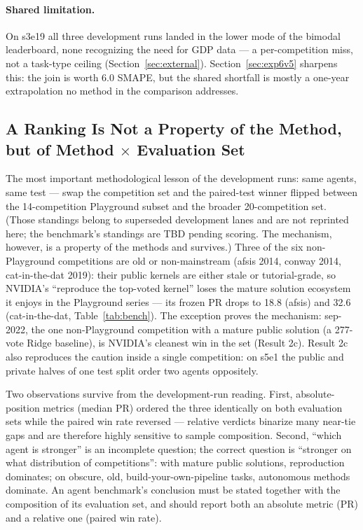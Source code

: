 \documentclass[11pt,a4paper]{article}
\begin{document}
\paragraph{Shared limitation.} On s3e19 all three development runs landed in the lower mode of the bimodal leaderboard, none recognizing the need for GDP data --- a per-competition miss, not a task-type ceiling (Section~\ref{sec:external}). Section~\ref{sec:exp6v5} sharpens this: the join is worth $6.0$ SMAPE, but the shared shortfall is mostly a one-year extrapolation no method in the comparison addresses.

\subsection{A Ranking Is Not a Property of the Method, but of Method $\times$ Evaluation Set}
\label{sec:reversal}

The most important methodological lesson of the development runs: same agents, same test --- swap the competition set and the paired-test winner flipped between the 14-competition Playground subset and the broader 20-competition set. (Those standings belong to superseded development lanes and are not reprinted here; the benchmark's standings are TBD pending scoring. The mechanism, however, is a property of the methods and survives.) Three of the six non-Playground competitions are old or non-mainstream (afsis 2014, conway 2014, cat-in-the-dat 2019): their public kernels are either stale or tutorial-grade, so NVIDIA's ``reproduce the top-voted kernel'' loses the mature solution ecosystem it enjoys in the Playground series --- its frozen PR drops to 18.8 (afsis) and 32.6 (cat-in-the-dat, Table~\ref{tab:bench}). The exception proves the mechanism: sep-2022, the one non-Playground competition with a mature public solution (a 277-vote Ridge baseline), is NVIDIA's cleanest win in the set (Result 2c). Result 2c also reproduces the caution inside a single competition: on s5e1 the public and private halves of one test split order two agents oppositely.

Two observations survive from the development-run reading. First, absolute-position metrics (median PR) ordered the three identically on both evaluation sets while the paired win rate reversed --- relative verdicts binarize many near-tie gaps and are therefore highly sensitive to sample composition. Second, ``which agent is stronger'' is an incomplete question; the correct question is ``stronger on what distribution of competitions'': with mature public solutions, reproduction dominates; on obscure, old, build-your-own-pipeline tasks, autonomous methods dominate. An agent benchmark's conclusion must be stated together with the composition of its evaluation set, and should report both an absolute metric (PR) and a relative one (paired win rate).
\end{document}
